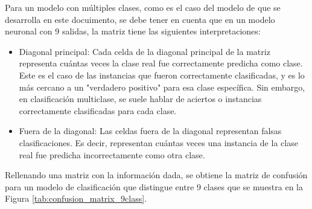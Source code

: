 Para un modelo con múltiples clases, como es el caso del modelo de que se desarrolla en este docuimento, se debe tener en cuenta que en un modelo neuronal con 9 salidas, la matriz tiene las siguientes interpretaciones:
\begin{itemize}
	\item Diagonal principal: Cada celda de la diagonal principal de la matriz representa cuántas veces la clase real fue correctamente predicha como clase. Este es el caso de las instancias que fueron correctamente clasificadas, y es lo más cercano a un "verdadero positivo" para esa clase específica. Sin embargo, en clasificación multiclase, se suele hablar de aciertos o instancias correctamente clasificadas para cada clase.
	\item Fuera de la diagonal: Las celdas fuera de la diagonal representan falsas clasificaciones. Es decir, representan cuántas veces una instancia de la clase real fue predicha incorrectamente como otra clase.

\end{itemize}
Rellenando una matriz con la información dada, se obtiene la matriz de confusión para un modelo de clasificación que distingue entre 9 clases que se muestra en la Figura \ref{tab:confusion_matrix_9class}.


